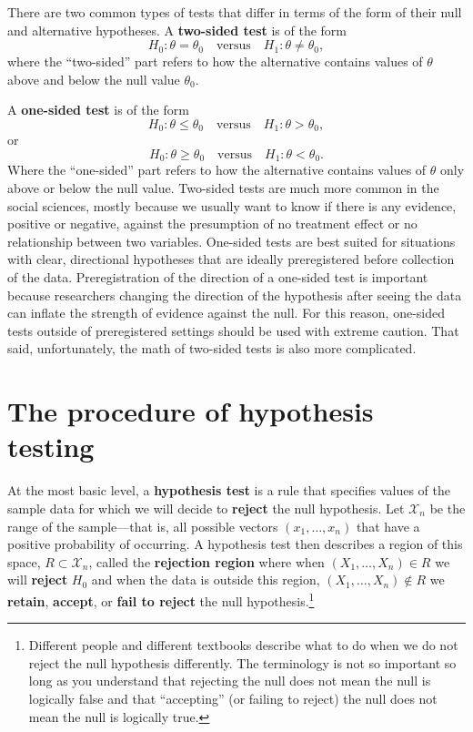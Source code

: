 \documentclass[
  letterpaper,
  DIV=11,
  numbers=noendperiod]{scrreprt}
\theoremstyle{definition}
\theoremstyle{definition}
\theoremstyle{plain}
\theoremstyle{remark}
\begin{document}
There are two common types of tests that differ in terms of the form of
their null and alternative hypotheses. A \textbf{two-sided test} is of
the form \[
H_0: \theta = \theta_0 \quad\text{versus}\quad H_1: \theta \neq \theta_0,
\] where the ``two-sided'' part refers to how the alternative contains
values of \(\theta\) above and below the null value \(\theta_0\).

A \textbf{one-sided test} is of the form \[
H_0: \theta \leq \theta_0 \quad\text{versus}\quad H_1: \theta > \theta_0,
\] or \[
H_0: \theta \geq \theta_0 \quad\text{versus}\quad H_1: \theta < \theta_0.
\] Where the ``one-sided'' part refers to how the alternative contains
values of \(\theta\) only above or below the null value. Two-sided tests
are much more common in the social sciences, mostly because we usually
want to know if there is any evidence, positive or negative, against the
presumption of no treatment effect or no relationship between two
variables. One-sided tests are best suited for situations with clear,
directional hypotheses that are ideally preregistered before collection
of the data. Preregistration of the direction of a one-sided test is
important because researchers changing the direction of the hypothesis
after seeing the data can inflate the strength of evidence against the
null. For this reason, one-sided tests outside of preregistered settings
should be used with extreme caution. That said, unfortunately, the math
of two-sided tests is also more complicated.

\hypertarget{the-procedure-of-hypothesis-testing}{%
\section{The procedure of hypothesis
testing}\label{the-procedure-of-hypothesis-testing}}

At the most basic level, a \textbf{hypothesis test} is a rule that
specifies values of the sample data for which we will decide to
\textbf{reject} the null hypothesis. Let \(\mathcal{X}_n\) be the range
of the sample---that is, all possible vectors \((x_1, \ldots, x_n)\)
that have a positive probability of occurring. A hypothesis test then
describes a region of this space, \(R \subset \mathcal{X}_n\), called
the \textbf{rejection region} where when \((X_1, \ldots, X_n) \in R\) we
will \textbf{reject} \(H_0\) and when the data is outside this region,
\((X_1, \ldots, X_n) \notin R\) we \textbf{retain}, \textbf{accept}, or
\textbf{fail to reject} the null hypothesis.\footnote{Different people
  and different textbooks describe what to do when we do not reject the
  null hypothesis differently. The terminology is not so important so
  long as you understand that rejecting the null does not mean the null
  is logically false and that ``accepting'' (or failing to reject) the
  null does not mean the null is logically true.}
\end{document}
